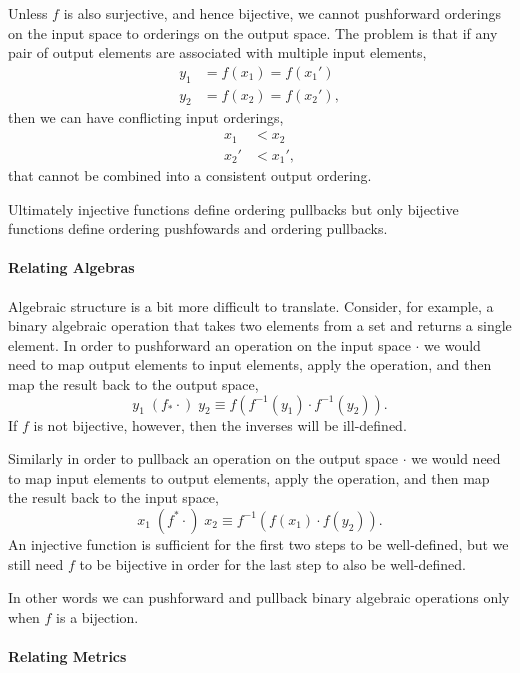 \documentclass[
  letterpaper,
  DIV=11,
  numbers=noendperiod]{scrartcl}
\let\oldparagraph\paragraph
\renewcommand{\paragraph}[1]{\oldparagraph{#1}\mbox{}}
\begin{document}
Unless \(f\) is also surjective, and hence bijective, we cannot
pushforward orderings on the input space to orderings on the output
space. The problem is that if any pair of output elements are associated
with multiple input elements, \begin{align*}
y_{1} &= f(x_1) = f(x_1')
\\
y_{2} &= f(x_2) = f(x_2'),
\end{align*} then we can have conflicting input orderings,
\begin{align*}
x_1 &< x_2
\\
x_2' &< x_1',
\end{align*} that cannot be combined into a consistent output ordering.

Ultimately injective functions define ordering pullbacks but only
bijective functions define ordering pushfowards and ordering pullbacks.

\hypertarget{relating-algebras}{%
\paragraph{Relating Algebras}\label{relating-algebras}}

Algebraic structure is a bit more difficult to translate. Consider, for
example, a binary algebraic operation that takes two elements from a set
and returns a single element. In order to pushforward an operation on
the input space \(\cdot\) we would need to map output elements to input
elements, apply the operation, and then map the result back to the
output space, \[
y_1 \; (f_{*} \cdot) \; y_2 \equiv f \left( f^{-1}(y_1) \cdot f^{-1}(y_2) \right).
\] If \(f\) is not bijective, however, then the inverses will be
ill-defined.

Similarly in order to pullback an operation on the output space
\(\cdot\) we would need to map input elements to output elements, apply
the operation, and then map the result back to the input space, \[
x_1 \; (f^{*} \cdot) \; x_2 \equiv f^{-1} \left( f(x_1) \cdot f(y_2) \right).
\] An injective function is sufficient for the first two steps to be
well-defined, but we still need \(f\) to be bijective in order for the
last step to also be well-defined.

In other words we can pushforward and pullback binary algebraic
operations only when \(f\) is a bijection.

\hypertarget{relating-metrics}{%
\paragraph{Relating Metrics}\label{relating-metrics}}
\end{document}
